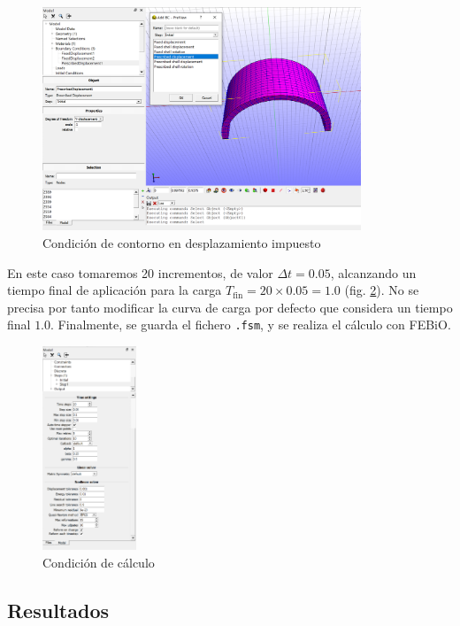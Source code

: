 \begin{figure}[!htp]
\centering
\includegraphics[width=0.85\textwidth]{figuras_3/a6.png}
\caption{Condición de contorno en desplazamiento impuesto}
\label{fig:a09}
\end{figure}

En este caso tomaremos 20 incrementos, de valor $\Delta t=0.05$, alcanzando un tiempo final de aplicación para la carga $T_\text{fin}=20\times 0.05=1.0$ (fig. \ref{fig:a10}). No se precisa por tanto modificar la curva de carga por defecto que considera un tiempo final $1.0$. Finalmente, se guarda el fichero \texttt{.fsm}, y se realiza el cálculo con FEBiO.

\begin{figure}[!htp]
\centering
\includegraphics[width=0.25\textwidth]{figuras_3/a7.png}
\caption{Condición de cálculo}
\label{fig:a10}
\end{figure}

\subsection{Resultados}

